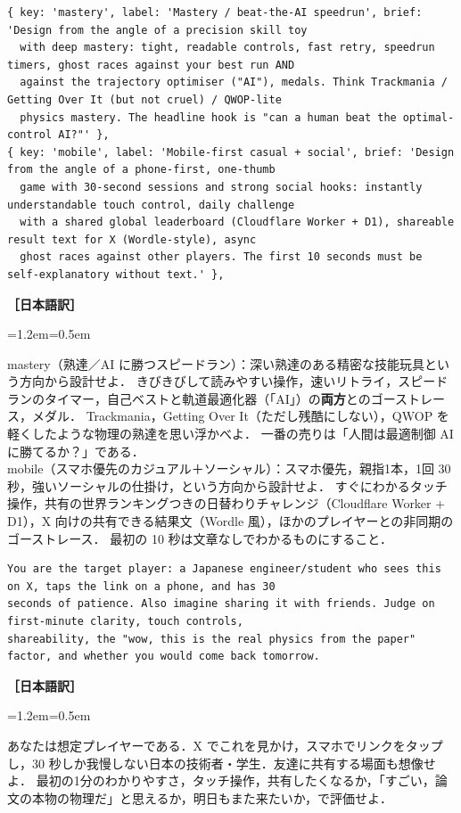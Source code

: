 \documentclass[a4paper,10pt]{ltjsarticle}
\newenvironment{yaku}{\par\vspace{-2pt}\small\noindent\textbf{［日本語訳］}\par\nopagebreak\begin{list}{}{\leftmargin=1.2em\rightmargin=0.5em\topsep=1pt}\item\relax}{\end{list}\vspace{4pt}}
\begin{document}
\begin{lstlisting}[caption={5案の方向づけ（mastery と mobile）}]
{ key: 'mastery', label: 'Mastery / beat-the-AI speedrun', brief: 'Design from the angle of a precision skill toy
  with deep mastery: tight, readable controls, fast retry, speedrun timers, ghost races against your best run AND
  against the trajectory optimiser ("AI"), medals. Think Trackmania / Getting Over It (but not cruel) / QWOP-lite
  physics mastery. The headline hook is "can a human beat the optimal-control AI?"' },
{ key: 'mobile', label: 'Mobile-first casual + social', brief: 'Design from the angle of a phone-first, one-thumb
  game with 30-second sessions and strong social hooks: instantly understandable touch control, daily challenge
  with a shared global leaderboard (Cloudflare Worker + D1), shareable result text for X (Wordle-style), async
  ghost races against other players. The first 10 seconds must be self-explanatory without text.' },
\end{lstlisting}
\begin{yaku}
mastery（熟達／AI に勝つスピードラン）：深い熟達のある精密な技能玩具という方向から設計せよ．
きびきびして読みやすい操作，速いリトライ，スピードランのタイマー，自己ベストと軌道最適化器（「AI」）の\textbf{両方}とのゴーストレース，メダル．
Trackmania，Getting Over It（ただし残酷にしない），QWOP を軽くしたような物理の熟達を思い浮かべよ．
一番の売りは「人間は最適制御 AI に勝てるか？」である．\\[3pt]
mobile（スマホ優先のカジュアル＋ソーシャル）：スマホ優先，親指1本，1回 30 秒，強いソーシャルの仕掛け，という方向から設計せよ．
すぐにわかるタッチ操作，共有の世界ランキングつきの日替わりチャレンジ（Cloudflare Worker + D1），X 向けの共有できる結果文（Wordle 風），ほかのプレイヤーとの非同期のゴーストレース．
最初の 10 秒は文章なしでわかるものにすること．
\end{yaku}

\begin{lstlisting}[caption={審査役「プレイヤー」の観点}]
You are the target player: a Japanese engineer/student who sees this on X, taps the link on a phone, and has 30
seconds of patience. Also imagine sharing it with friends. Judge on first-minute clarity, touch controls,
shareability, the "wow, this is the real physics from the paper" factor, and whether you would come back tomorrow.
\end{lstlisting}
\begin{yaku}
あなたは想定プレイヤーである．X でこれを見かけ，スマホでリンクをタップし，30 秒しか我慢しない日本の技術者・学生．友達に共有する場面も想像せよ．
最初の1分のわかりやすさ，タッチ操作，共有したくなるか，「すごい，論文の本物の物理だ」と思えるか，明日もまた来たいか，で評価せよ．
\end{yaku}
\end{document}

